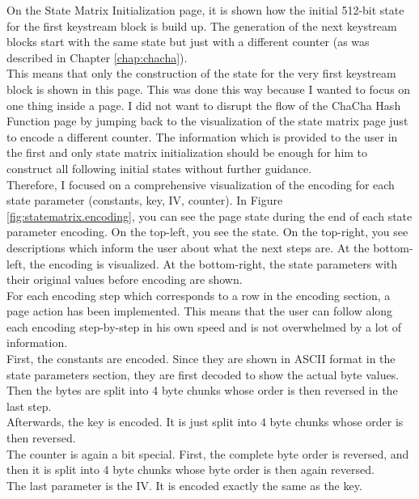 On the State Matrix Initialization page, it is shown how the initial 512-bit state for the first keystream block is build up. The generation of the next keystream blocks start with the same state but just with a different counter (as was described in Chapter \ref{chap:chacha}). \\
This means that only the construction of the state for the very first keystream block is shown in this page. This was done this way because I wanted to focus on one thing inside a page. I did not want to disrupt the flow of the ChaCha Hash Function page by jumping back to the visualization of the state matrix page just to encode a different counter. The information which is provided to the user in the first and only state matrix initialization should be enough for him to construct all following initial states without further guidance. \\
Therefore, I focused on a comprehensive visualization of the encoding for each state parameter (constants, key, IV, counter). In Figure \ref{fig:statematrix.encoding}, you can see the page state during the end of each state parameter encoding. On the top-left, you see the state. On the top-right, you see descriptions which inform the user about what the next steps are.
At the bottom-left, the encoding is visualized. At the bottom-right, the state parameters with their original values before encoding are shown.\\
For each encoding step which corresponds to a row in the encoding section, a page action has been implemented. This means that the user can follow along each encoding step-by-step in his own speed and is not overwhelmed by a lot of information.\\
First, the constants are encoded. Since they are shown in ASCII format in the state parameters section, they are first decoded to show the actual byte values. Then the bytes are split into 4 byte chunks whose order is then reversed in the last step. \\
Afterwards, the key is encoded. It is just split into 4 byte chunks whose order is then reversed. \\
The counter is again a bit special. First, the complete byte order is reversed, and then it is split into 4 byte chunks whose byte order is then again reversed. \\
The last parameter is the IV. It is encoded exactly the same as the key. \\

